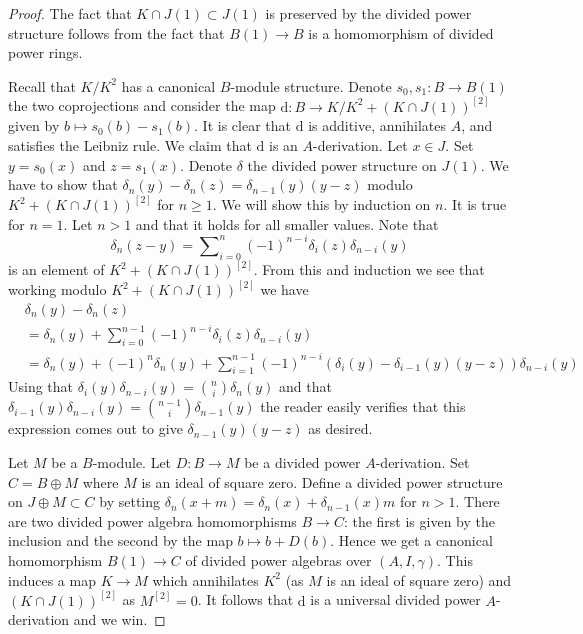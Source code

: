 \begin{proof}
The fact that $K \cap J(1) \subset J(1)$ is preserved by the divided power
structure follows from the fact that $B(1) \to B$ is a homomorphism of
divided power rings.

\medskip\noindent
Recall that $K/K^2$ has a canonical $B$-module structure.
Denote $s_0, s_1 : B \to B(1)$ the two coprojections and consider
the map $\text{d} : B \to K/K^2 +(K \cap J(1))^{[2]}$ given by
$b \mapsto s_0(b) - s_1(b)$. It is clear that $\text{d}$ is additive,
annihilates $A$, and satisfies the Leibniz rule.
We claim that $\text{d}$ is an $A$-derivation.
Let $x \in J$. Set $y = s_0(x)$ and $z = s_1(x)$.
Denote $\delta$ the divided power structure on $J(1)$.
We have to show that $\delta_n(y) - \delta_n(z) = \delta_{n - 1}(y)(y - z)$
modulo $K^2 +(K \cap J(1))^{[2]}$ for $n \geq 1$. We will show this
by induction on $n$. It is true for $n = 1$.
Let $n > 1$ and that it holds for all smaller values.
Note that
$$
\delta_n(z - y) =
\sum\nolimits_{i = 0}^n (-1)^{n - i}\delta_i(z)\delta_{n - i}(y)
$$
is an element of $K^2 +(K \cap J(1))^{[2]}$. From this and induction
we see that working modulo $K^2 +(K \cap J(1))^{[2]}$ we have
\begin{align*}
& \delta_n(y) - \delta_n(z) \\
& =
\delta_n(y) +
\sum\nolimits_{i = 0}^{n - 1} (-1)^{n - i}\delta_i(z)\delta_{n - i}(y) \\
& =
\delta_n(y) + (-1)^n\delta_n(y) +
\sum\nolimits_{i = 1}^{n - 1}
(-1)^{n - i}(\delta_i(y) - \delta_{i - 1}(y)(y - z))\delta_{n - i}(y)
\end{align*}
Using that $\delta_i(y)\delta_{n - i}(y) = \binom{n}{i} \delta_n(y)$
and that $\delta_{i - 1}(y)\delta_{n - i}(y) =
\binom{n - 1}{i} \delta_{n - 1}(y)$
the reader easily verifies that this expression comes out to give
$\delta_{n - 1}(y)(y - z)$ as desired.

\medskip\noindent
Let $M$ be a $B$-module. Let $D : B \to M$ be a divided power $A$-derivation.
Set $C = B \oplus M$ where $M$ is an ideal of square zero. Define a
divided power structure on $J \oplus M \subset C$ by setting
$\delta_n(x + m) = \delta_n(x) + \delta_{n - 1}(x)m$ for $n > 1$.
There are two divided power algebra homomorphisms $B \to C$: the first
is given by the inclusion and the second by the map $b \mapsto b + D(b)$.
Hence we get a canonical homomorphism $B(1) \to C$ of divided power
algebras over $(A, I, \gamma)$. This induces a map $K \to M$
which annihilates $K^2$ (as $M$ is an ideal of square zero) and
$(K \cap J(1))^{[2]}$ as $M^{[2]} = 0$. It follows that $\text{d}$
is a universal divided power $A$-derivation and we win.
\end{proof}






